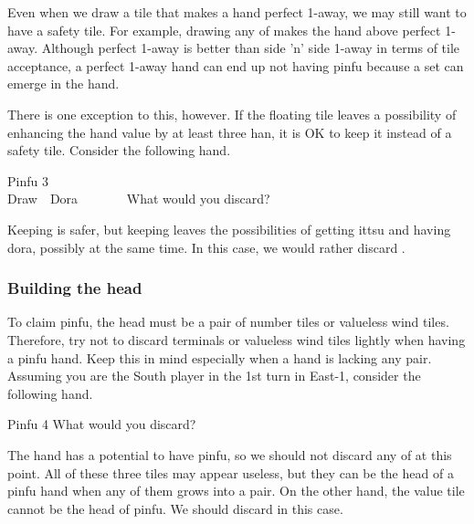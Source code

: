 \bigskip
Even when we draw a tile that makes a hand perfect 1-away, we may still want to have a safety tile. For example, drawing any of {\LARGE{}} makes the hand above perfect 1-away.
Although perfect 1-away is better than side 'n' side 1-away in terms of tile acceptance, a perfect 1-away hand can end up not having {\jap pinfu} because a set can emerge in the hand.

\vfill
There is one exception to this, however. If the floating tile leaves a possibility of enhancing the hand value by at least three {\jap han}, it is OK to keep it instead of a safety tile. Consider the following hand.
\begin{itembox}[r]{{\jap Pinfu} 3}
\bp
{}~\xi~\\
\hfill\footnotesize{Draw~~{\jap Dora}~~~~~~~}
\ep
\vspace{-17pt}What would you discard? \vspace{-5pt}
\end{itembox}

\bigskip
\noindent Keeping {\LARGE\xi} is safer, but keeping {\LARGE{}} leaves the possibilities of getting {\jap ittsu} and having {\jap dora}, possibly at the same time. In this case, we would rather discard {\LARGE\xi}.

\newpage

\subsubsection{Building the head}
To claim {\jap pinfu}, the head must be a pair of number tiles or valueless wind tiles. Therefore, try not to discard terminals or valueless wind tiles lightly when having a {\jap pinfu} hand. Keep this in mind especially when a hand is lacking any pair. Assuming you are the South player in the 1st turn in East-1, consider the following hand.
\begin{itembox}[r]{{\jap Pinfu} 4}
\bp
{}\xi\fa
\ep
\vspace{-10pt}What would you discard? \vspace{-5pt}
\end{itembox}

\bigskip
\noindent The hand has a potential to have {\jap pinfu}, so we should not discard any of {\LARGE{}\xi} at this point. All of these three tiles may appear useless, but they can be the head of a {\jap pinfu} hand when any of them grows into a pair. On the other hand, the value tile {\LARGE\fa} cannot be the head of {\jap pinfu}. We should discard {\LARGE\fa} in this case.

